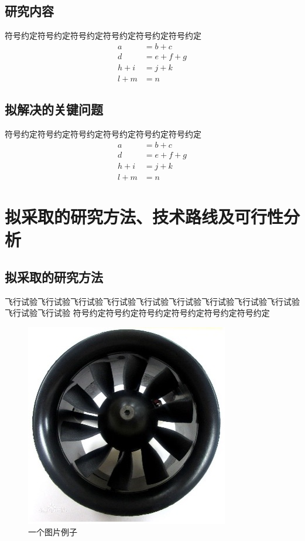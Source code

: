 \begin{ubox}
\subsection{研究内容}
符号约定符号约定符号约定符号约定符号约定符号约定
\begin{equation}
	\begin{aligned}
		a &= b + c \\
		d &= e + f + g \\
		h + i &= j + k \\
		l + m &= n
	\end{aligned}
\end{equation}
\subsection{拟解决的关键问题}
符号约定符号约定符号约定符号约定符号约定符号约定
\setcounter{equation}{0} 
\begin{equation}
	\begin{aligned}
		a &= b + c \\
		d &= e + f + g \\
		h + i &= j + k \\
		l + m &= n
	\end{aligned}
\end{equation}
\section{拟采取的研究方法、技术路线及可行性分析}
\subsection{拟采取的研究方法}
飞行试验飞行试验飞行试验飞行试验飞行试验飞行试验飞行试验飞行试验飞行试验飞行试验飞行试验
符号约定符号约定符号约定符号约定符号约定符号约定
\begin{table}[H]
	\centering
	\small
	\caption{数值}
\end{table}
\begin{figure}[H]
	\centering
	\includegraphics[width=0.4\linewidth]{p1.jpg}
	\caption{一个图片例子}
	\label{fig:main}
\end{figure}

\end{ubox}
